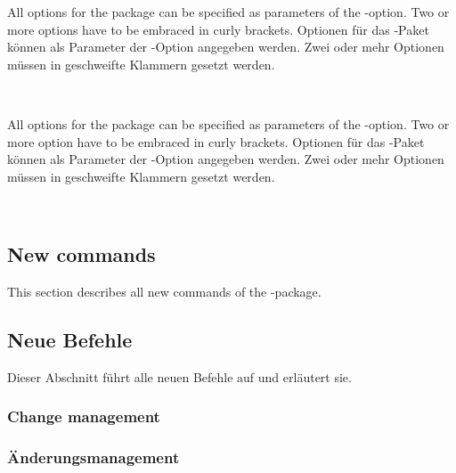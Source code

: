 \ifENGLISH
 All options for the  package can be specified as parameters of the -option.
 Two or more options have to be embraced in curly brackets.
\fi
	\ifGERMAN
	 Optionen für das -Paket können als Parameter der -Option angegeben werden.
	 Zwei oder mehr Optionen müssen in geschweifte Klammern gesetzt werden.
	\fi

\\


\ifENGLISH
 All options for the  package can be specified as parameters of the -option.
 Two or more option have to be embraced in curly brackets.
\fi
	\ifGERMAN
	 Optionen für das -Paket können als Parameter der -Option angegeben werden.
	 Zwei oder mehr Optionen müssen in geschweifte Klammern gesetzt werden.
	\fi

\\

\ifENGLISH
 \subsection{New commands}

 This section describes all new commands of the -package.
\fi
	\ifGERMAN
	 \subsection{Neue Befehle}

	 Dieser Abschnitt führt alle neuen Befehle auf und erläutert sie.
	\fi

\ifENGLISH
 \subsubsection{Change management}
\fi
	\ifGERMAN
	 \subsubsection{Änderungsmanagement}
	\fi

